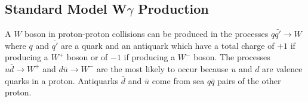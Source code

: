 \subsection{Standard Model W$\gamma$ Production}
\label{WgAbout_SMproduction}










A $W$ boson in proton-proton collisions can be produced in the processes $q {\bar{q'}} \rightarrow W$ where $q$ and $\bar{q'}$ are a quark and an antiquark which have a total charge of $+1$ if producing a $W^+$ boson or of $-1$ if producing a $W^-$ boson. The processes $u\bar{d}\rightarrow W^+$ and $d\bar{u}\rightarrow W^-$ are the most likely to occur because $u$ and $d$ are valence quarks in a proton. Antiquarks $\bar{d}$ and $\bar{u}$ come from sea $q\bar{q}$ pairs of the other proton.\\

